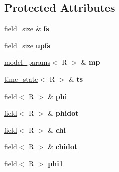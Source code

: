 \subsection*{Protected Attributes}
\begin{DoxyCompactItemize}
\item 
\hypertarget{classrk4_afe0b3e6a2f96cea1ebe881ca0aef0862}{
\hyperlink{structfield__size}{field\_\-size} \& {\bfseries fs}}
\label{classrk4_afe0b3e6a2f96cea1ebe881ca0aef0862}

\item 
\hypertarget{classrk4_a9cdc6aaad4517190a829e845eab95447}{
\hyperlink{structfield__size}{field\_\-size} {\bfseries upfs}}
\label{classrk4_a9cdc6aaad4517190a829e845eab95447}

\item 
\hypertarget{classrk4_a581eef6e9ad6b101b04c93d051e4f634}{
\hyperlink{structmodel__params}{model\_\-params}$<$ R $>$ \& {\bfseries mp}}
\label{classrk4_a581eef6e9ad6b101b04c93d051e4f634}

\item 
\hypertarget{classrk4_a55651dfa97a653e008c40de715e60825}{
\hyperlink{structtime__state}{time\_\-state}$<$ R $>$ \& {\bfseries ts}}
\label{classrk4_a55651dfa97a653e008c40de715e60825}

\item 
\hypertarget{classrk4_a9760be7b78db1d69e367e2e77442e0c1}{
\hyperlink{classfield}{field}$<$ R $>$ \& {\bfseries phi}}
\label{classrk4_a9760be7b78db1d69e367e2e77442e0c1}

\item 
\hypertarget{classrk4_acb8d6d981d3f0f1a0a117493e4e51e7f}{
\hyperlink{classfield}{field}$<$ R $>$ \& {\bfseries phidot}}
\label{classrk4_acb8d6d981d3f0f1a0a117493e4e51e7f}

\item 
\hypertarget{classrk4_a8c46486589b9dcb6c58c339373e0bdf8}{
\hyperlink{classfield}{field}$<$ R $>$ \& {\bfseries chi}}
\label{classrk4_a8c46486589b9dcb6c58c339373e0bdf8}

\item 
\hypertarget{classrk4_ad3b83eb5a6571a9549b3c69b019a51f3}{
\hyperlink{classfield}{field}$<$ R $>$ \& {\bfseries chidot}}
\label{classrk4_ad3b83eb5a6571a9549b3c69b019a51f3}

\item 
\hypertarget{classrk4_a699dedb5a35ca9ba4f79c4aef5d7865d}{
\hyperlink{classfield}{field}$<$ R $>$ {\bfseries phi1}}
\label{classrk4_a699dedb5a35ca9ba4f79c4aef5d7865d}


\end{DoxyCompactItemize}
